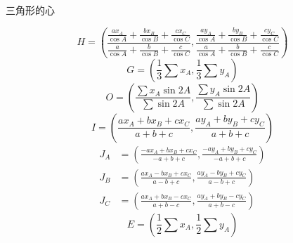 \documentclass[a4paper,12pt]{article}
\begin{document}
\begin{CJK}{UTF8}{gbsn}
\begin{appbox}{三角形的心}
    \begin{center}
        
    \end{center}
        \begin{equation}
            H=\left( \frac{\frac{ax_A}{\cos A}+\frac{bx_B}{\cos B}+\frac{cx_C}{\cos C}}{\frac{a}{\cos A}+\frac{b}{\cos B}+\frac{c}{\cos C}},\frac{\frac{ay_A}{\cos A}+\frac{by_B}{\cos B}+\frac{cy_C}{\cos C}}{\frac{a}{\cos A}+\frac{b}{\cos B}+\frac{c}{\cos C}} \right)
        \end{equation}
        \begin{equation}
            G=\left( \frac{1}{3}\sum x_A, \frac{1}{3}\sum y_A \right)
        \end{equation}
        \begin{equation}
            O=\left( \frac{\sum x_A \sin 2A}{\sum \sin 2A}, \frac{\sum y_A \sin 2A}{\sum \sin 2A} \right)
        \end{equation}
        \begin{equation}
            I=\left( \frac{ax_A+bx_B+cx_C}{a+b+c}, \frac{ay_A+by_B+cy_C}{a+b+c} \right)
        \end{equation}
        \begin{align}
            J_A &= \left( \frac{-ax_A+bx_B+cx_C}{-a+b+c},\frac{-ay_A+by_B+cy_C}{-a+b+c} \right) \\
            J_B &= \left( \frac{ax_A-bx_B+cx_C}{a-b+c},\frac{ay_A-by_B+cy_C}{a-b+c} \right) \\
            J_C &= \left( \frac{ax_A+bx_B-cx_C}{a+b-c},\frac{ay_A+by_B-cy_C}{a+b-c} \right) 
        \end{align}
        \begin{equation}
            E=\left( \frac{1}{2}\sum x_A, \frac{1}{2}\sum y_A \right)
        \end{equation}
\end{appbox}



\end{CJK}
\end{document}
